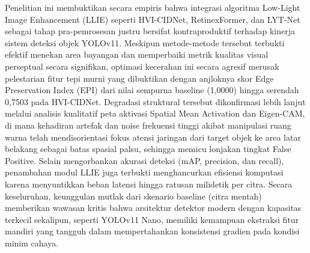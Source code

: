 \documentclass[conference]{IEEEtran}
\begin{document}
Penelitian ini membuktikan secara empiris bahwa integrasi algoritma Low-Light Image Enhancement (LLIE) seperti HVI-CIDNet, RetinexFormer, dan LYT-Net sebagai tahap pra-pemrosesan justru bersifat kontraproduktif terhadap kinerja sistem deteksi objek YOLOv11. Meskipun metode-metode tersebut terbukti efektif menekan area bayangan dan memperbaiki metrik kualitas visual perseptual secara signifikan, optimasi kecerahan ini secara agresif merusak pelestarian fitur tepi murni yang dibuktikan dengan anjloknya skor Edge Preservation Index (EPI) dari nilai sempurna baseline (1,0000) hingga serendah 0,7503 pada HVI-CIDNet. Degradasi struktural tersebut dikonfirmasi lebih lanjut melalui analisis kualitatif peta aktivasi Spatial Mean Activation dan Eigen-CAM, di mana kehadiran artefak dan noise frekuensi tinggi akibat manipulasi ruang warna telah mendisorientasi fokus atensi jaringan dari target objek ke area latar belakang sebagai batas spasial palsu, sehingga memicu lonjakan tingkat False Positive. Selain mengorbankan akurasi deteksi (mAP, precision, dan recall), penambahan modul LLIE juga terbukti menghancurkan efisiensi komputasi karena menyuntikkan beban latensi hingga ratusan milidetik per citra. Secara keseluruhan, keunggulan mutlak dari skenario baseline (citra mentah) memberikan wawasan kritis bahwa arsitektur detektor modern dengan kapasitas terkecil sekalipun, seperti YOLOv11 Nano, memiliki kemampuan ekstraksi fitur mandiri yang tangguh dalam mempertahankan konsistensi gradien pada kondisi minim cahaya.


\end{document}
